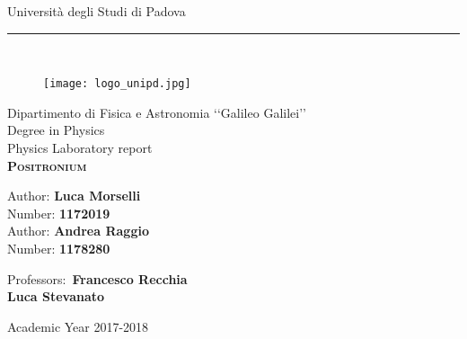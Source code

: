 \begin{titlepage}
	
	\begin{center}
		\LARGE{Università degli Studi di Padova}\\
		\noindent\rule{12cm}{0.4pt}\\
		\begin{figure}[H]
			\centering
			\texttt{[image: logo\_unipd.jpg]}
		\end{figure}
		\vspace{-0.2em}
		\Large{Dipartimento di Fisica e Astronomia ‘‘Galileo Galilei’’}\\
		\vspace{2em}
		\Large{Degree in Physics}\\
		\vspace{2em}
		\normalsize{Physics Laboratory report}\\
		\vspace{3.5em}
		\LARGE{\textsc{\textbf{Positronium}}}\\
		\vspace{3em}
		\begin{flushleft}
			\Large{Author: \textbf{Luca Morselli}}\\
			\Large{Number: \textbf{1172019}}\\
			\vspace{0.5em}
			\Large{Author: \textbf{Andrea Raggio}}\\
			\Large{Number: \textbf{1178280}}
		\end{flushleft}
		\vspace{2em}
	\end{center}
	\begin{flushright}
		\normalsize{Professors:~\textbf{Francesco Recchia\\Luca Stevanato\\}}
	\end{flushright}
	\begin{center}
		\vspace{2.5em}
		\LARGE{Academic Year 2017-2018}\\
	\end{center}
	
\end{titlepage}